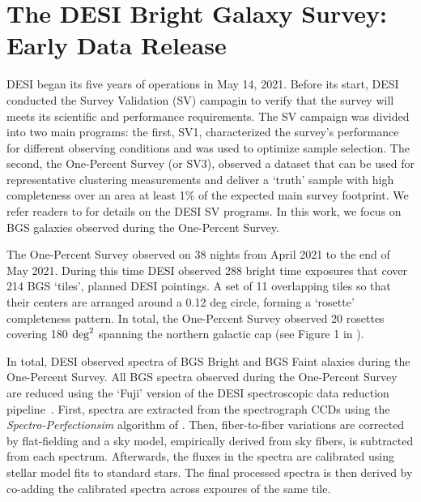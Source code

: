 \section{The DESI Bright Galaxy Survey: Early Data Release}  \label{sec:edr}
DESI began its five years of operations in May 14, 2021. 
Before its start, DESI conducted the Survey Validation (SV) campagin to verify
that the survey will meets its scientific and performance requirements. 
The SV campaign was divided into two main programs: the first, SV1,
characterized the survey's performance for different observing conditions and
was used to optimize sample selection. 
The second, the One-Percent Survey (or SV3), observed a dataset that can be
used for representative clustering measurements and deliver a ‘truth’ sample
with high completeness over an area at least 1\% of the expected main survey
footprint.
We refer readers to \cite{sv_paper} for details on the DESI SV programs.
In this work, we focus on BGS galaxies observed during the One-Percent Survey.

The One-Percent Survey observed on 38 nights from April 2021 to the end of 
May 2021.
During this time DESI observed 288 bright time exposures that cover 214 BGS
`tiles', planned DESI pointings. 
A set of 11 overlapping tiles so that their centers are arranged around a 0.12
deg circle, forming a ‘rosette’ completeness pattern. 
In total, the One-Percent Survey observed 20 rosettes covering 180 
${\rm deg}^2$ spanning the northern galactic cap (see Figure 1 in
\citealt{hahn2022}).  


In total, DESI observed spectra of  BGS Bright and 
BGS Faint alaxies during the One-Percent Survey. 
All BGS spectra observed during the One-Percent Survey are reduced using the
`Fuji' version of the DESI spectroscopic data reduction
pipeline~\citep{guy2022}. 
First, spectra are extracted from the spectrograph CCDs using the 
{\em Spectro-Perfectionsim} algorithm of \cite{bolton2010}.
Then, fiber-to-fiber variations are corrected by flat-fielding and a sky model,
empirically derived from sky fibers, is subtracted from each spectrum.
Afterwards, the fluxes in the spectra are calibrated using stellar model fits
to standard stars. 
The final processed spectra is then derived by co-adding the calibrated spectra
across expoures of the same tile. 




